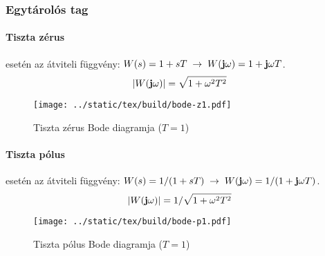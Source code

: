 \documentclass[../main.tex]{subfiles}
\begin{document}
\subsubsection*{Egytárolós tag}

\paragraph*{Tiszta zérus}

 esetén az átviteli függvény: $W(s) = 1 + sT \; \rightarrow \; W(\mathbf{j} \omega) = 1 + \mathbf{j} \omega T$.
\[
  |W(\mathbf{j} \omega)| = \sqrt{1 + \omega^2 T^2}
\]

\begin{figure}[H]
  \centering
  \texttt{[image: ../static/tex/build/bode-z1.pdf]} 
  \caption{Tiszta zérus Bode diagramja ($T = 1$)}
  \label{fig:bode-1z}
\end{figure}

\paragraph*{Tiszta pólus}

 esetén az átviteli függvény: $W(s) = 1/(1 + sT) \; \rightarrow \; W(\mathbf{j} \omega) =  1/(1 + \mathbf{j} \omega T)$.
\[
  |W(\mathbf{j} \omega)| = 1 / \sqrt{1 + \omega^2 T^2}
\]

\begin{figure}[H]
  \centering
  \texttt{[image: ../static/tex/build/bode-p1.pdf]} 
  \caption{Tiszta pólus Bode diagramja ($T = 1$)}
  \label{fig:bode-1p}
\end{figure}
\end{document}
